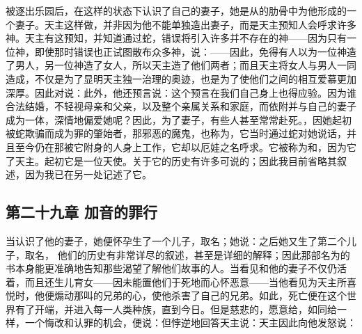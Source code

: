 被逐出乐园后，在这样的状态下认识了自己的妻子，她是从的肋骨中为他形成的一个妻子。天主这样做，并非因为他不能单独造出妻子，而是天主预知人会呼求许多神。天主有这预知，并知道通过蛇，错误将引入许多并不存在的神——因为只有一位神，即使那时错误也正试图散布众多神，说：——因此，免得有人以为一位神造了男人，另一位神造了女人，所以天主造了他们两者；而且天主将女人与男人一同造成，不仅是为了显明天主独一治理的奥迹，也是为了使他们之间的相互爱慕更加深厚。因此对说：此外，他还预言说：这个预言在我们自己身上也得应验。因为谁合法结婚，不轻视母亲和父亲，以及整个亲属关系和家庭，而依附并与自己的妻子成为一体，深情地偏爱她呢？因此，为了妻子，有些人甚至常常赴死。，因她起初被蛇欺骗而成为罪的肇始者，那邪恶的魔鬼，也称为，它当时通过蛇对她说话，并且至今仍在那被它附身的人身上工作，它却以厄娃之名呼求。它被称为和，因为它了天主。起初它是一位天使。关于它的历史有许多可说的；因此我目前省略其叙述，因为我已在另一处记述了它。\par


\subsection{第二十九章 加音的罪行}

当认识了他的妻子，她便怀孕生了一个儿子，取名；她说：之后她又生了第二个儿子，取名，  他们的历史有非常详尽的叙述，甚至是详细的解释；因此那部名为的书本身能更准确地告知那些渴望了解他们故事的人。当看见和他的妻子不仅仍活着，而且还生儿育女——因未能置他们于死地而心怀恶意——当他看见为天主所喜悦时，他便煽动那叫的兄弟的心，使他杀害了自己的兄弟。如此，死亡便在这个世界有了开端，并进入每一人类种族，直到今日。但是慈悲的，愿意给，如同给一样，一个悔改和认罪的机会，便说：但悖逆地回答天主说：天主因此向他发怒说：\par

